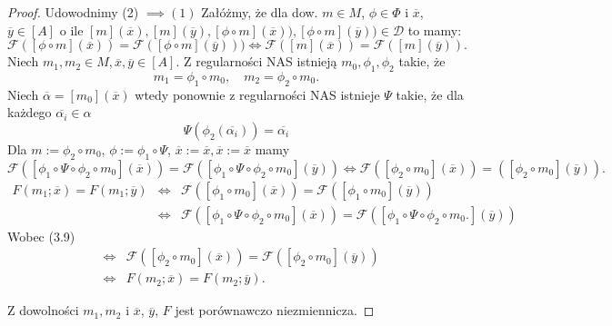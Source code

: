 \documentclass[12pt,a4paper]{report}
\newcommand{\domkniecie}[1]{\left[ {#1} \right] }
\begin{document}
\begin{proof}
Udowodnimy (2) $\implies (1)$
Załóżmy, że dla dow. $m \in M$, $\phi \in \Phi$ i $\overline{x}$, $\overline{y} \in \domkniecie{A}$ o ile $\domkniecie{m}(\overline{x}), \domkniecie{
m}(\overline{y}), \domkniecie{\phi\circ m}(\overline{x})), \domkniecie{\phi\circ m}(\overline{y})) \in \mathcal{D}$ to mamy:
\begin{equation}
\mathcal{F}(\domkniecie{\phi \circ m}(\overline{x}))=\mathcal{F}(\domkniecie{\phi \circ m}(\overline{y}))) \iff \mathcal{F}(\domkniecie{m}(\overline{x}))=\mathcal{F}(\domkniecie{m}(\overline{y})).
\end{equation}
Niech $m_1,m_2 \in M, \overline{x}, \overline{y} \in \domkniecie{A}$. Z regularności NAS istnieją $m_0, \phi_1,\phi_2$ takie, że
$$ 
m_1=\phi_1\circ m_0, \quad m_2=\phi_2\circ m_0.
$$
Niech $\overline{\alpha}=\domkniecie{m_0}(\overline{x})$ wtedy ponownie z regularności NAS istnieje $\Psi$ takie, że dla każdego $\overline{\alpha_i} \in \alpha$
$$
\Psi(\phi_2(\overline{\alpha_i}))=\overline{\alpha_i}
$$
Dla $m:=\phi_2 \circ m_0$, $\phi:=\phi_1\circ \Psi$, $\overline{x}:=\overline{x}, \overline{x}:=\overline{x}$ mamy 
$$
\mathcal{F}(\domkniecie{\phi_1\circ \Psi \circ \phi_2\circ m_0}(\overline{x}))=\mathcal{F}(\domkniecie{\phi_1\circ \Psi \circ \phi_2\circ m_0}(\overline{y})) \iff \mathcal{F}(\domkniecie{\phi_2\circ m_0}(\overline{x}))=(\domkniecie{\phi_2\circ m_0}(\overline{y})).
$$
\begin{eqnarray*}
F(m_1;\overline{x})=F(m_1;\overline{y}) & \iff  & \mathcal{F}(\domkniecie{\phi_1\circ m_0}(\overline{x}))=\mathcal{F}(\domkniecie{\phi_1 \circ m_0}(\overline{y}))\\
&  \iff & \mathcal{F}(\domkniecie{\phi_1\circ\Psi\circ\phi_2\circ m_0}(\overline{x}))=\mathcal{F}(\domkniecie{\phi_1\circ\Psi\circ\phi_2\circ m_0.}(\overline{y})) 
\end{eqnarray*}
Wobec (3.9)
\begin{eqnarray*}
& \iff & \mathcal{F}(\domkniecie{\phi_2\circ m_0}(\overline{x}))=\mathcal{F}(\domkniecie{\phi_2\circ m_0}(\overline{y}))\\
& \iff & F(m_2;\overline{x})=F(m_2;\overline{y}).
\end{eqnarray*}

Z dowolności $m_1, m_2$ i $\overline{x}$, $\overline{y}$, $F$ jest porównawczo niezmiennicza.


\end{proof}
\end{document}
